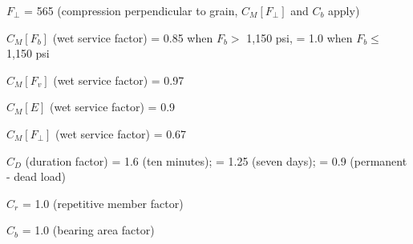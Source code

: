 \documentclass[12pt]{article}
\begin{document}
$F_\perp$ = 565 (compression perpendicular to grain, $C_M[F_\perp]$ and $C_b$
                 apply)

$C_M[F_b]$ (wet service factor)
    = 0.85 when $F_b >$ 1,150 psi, = 1.0 when $F_b \leq$ 1,150 psi

$C_M[F_v]$ (wet service factor) = 0.97

$C_M[E]$ (wet service factor) = 0.9

$C_M[F_\perp]$ (wet service factor) = 0.67

$C_D$ (duration factor) = 1.6 (ten minutes); = 1.25 (seven days);
                        = 0.9 (permanent - dead load)

$C_r$ = 1.0 (repetitive member factor)

$C_b$ = 1.0 (bearing area factor)
\end{document}
